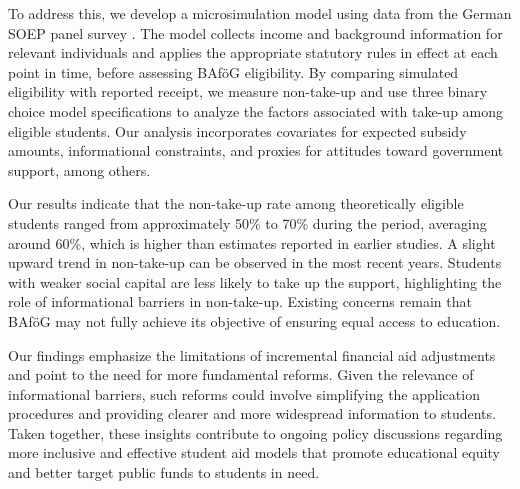 
To address this, we develop a microsimulation model using data from the German SOEP panel survey \citep{soepcore_v39}. 
The model collects income and background information for relevant individuals and applies the appropriate statutory rules in effect at each point in time, before assessing BAföG eligibility. 
By comparing simulated eligibility with reported receipt, we measure non-take-up and use three binary choice model specifications to analyze the factors associated with take-up among eligible students. 
Our analysis incorporates covariates for expected subsidy amounts, informational constraints, and proxies for attitudes toward government support, among others. 

Our results indicate that the non-take-up rate among theoretically eligible students ranged from approximately 50\% to 70\% during the period, averaging around 60\%, which is higher than estimates reported in earlier studies. 
A slight upward trend in non-take-up can be observed in the most recent years. 
Students with weaker social capital are less likely to take up the support, highlighting the role of informational barriers in non-take-up. 
Existing concerns remain that BAföG may not fully achieve its objective of ensuring equal access to education.


Our findings emphasize the limitations of incremental financial aid adjustments and point to the need for more fundamental reforms. 
Given the relevance of informational barriers, such reforms could involve simplifying the application procedures and providing clearer and more widespread information to students. 
Taken together, these insights contribute to ongoing policy discussions regarding more inclusive and effective student aid models that promote educational equity and better target public funds to students in need.

